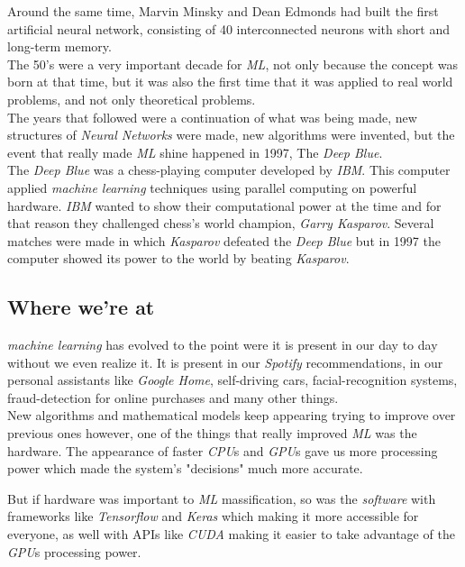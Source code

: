 \documentclass{llncs}
\begin{document}
Around the same time, Marvin Minsky and Dean Edmonds had built the first artificial neural network, consisting of 40 interconnected neurons with short and long-term memory.\\

The 50's were a very important decade for \emph{ML}, not only because the concept was born at that time, but it was also the first time that it was applied to real world problems, and not only theoretical problems.\\

The years that followed were a continuation of what was being made, new structures of \emph{Neural Networks} were made, new algorithms were invented, but the event that really made \emph{ML} shine happened in 1997, The \emph{Deep Blue}\cite{deepblue}.\\

The \emph{Deep Blue} was a chess-playing computer developed by \emph{IBM}. This computer applied \emph{machine learning} techniques using parallel computing on powerful hardware. \emph{IBM} wanted to show their computational power at the time and for that reason they challenged chess's world champion, \emph{Garry Kasparov}. Several matches were made in which \emph{Kasparov} defeated the \emph{Deep Blue} but in 1997 the computer showed its power to the world by beating \emph{Kasparov}. 

\subsection{Where we're at}
\emph{machine learning} has evolved to the point were it is present in our day to day without we even realize it. It is present in our \emph{Spotify} recommendations, in our personal assistants like \emph{Google Home}, self-driving cars, facial-recognition systems, fraud-detection for online purchases and many other things.\\

New algorithms and mathematical models keep appearing trying to improve over previous ones however, one of the things that really improved \emph{ML} was the hardware. The appearance of faster \emph{CPU}s and \emph{GPU}s gave us more processing power which made the system's "decisions" much more accurate. 

But if hardware was important to \emph{ML} massification, so was the \emph{software} with frameworks like \emph{Tensorflow} and \emph{Keras} which making it more accessible for everyone, as well with APIs like \emph{CUDA} making it easier to take advantage of the \emph{GPU}s processing power.
\end{document}
